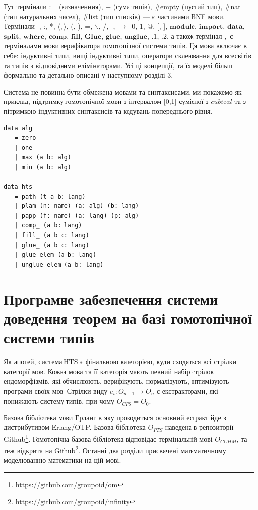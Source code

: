 \begin{definition}
\begin{definition}
\begin{definition}
\begin{definition}
Тут термінали := (визначенния), + (сума типів), \#empty (пустий тип), \#nat (тип натуральних чисел),
\#list (тип списків) --- є частинами BNF мови. Термінали
$\rvert$, :, *, $\langle$, $\rangle$, (, ), =, $\backslash$, /, -, $\rightarrow$, 0, 1, @, [, ],
$\mathbf{module}$, $\mathbf{import}$,
$\mathbf{data}$, $\mathbf{split}$, $\mathbf{where}$, $\mathbf{comp}$, $\mathbf{fill}$,
$\mathbf{Glue}$, $\mathbf{glue}$, $\mathbf{unglue}$,
$\mathbf{.1}$, $\mathbf{.2}$,
а також термінал $,$ є терміналами мови верифікатора гомотопічної системи типів.
Ця мова включає в себе: індуктивні типи, вищі індуктивні типи, оператори склеювання
для всесвітів та типів з відповідними елімінаторами. Усі ці концепції, та їх
моделі більш формально та детально описані у наступному розділі 3.

Система не повинна бути обмежена мовами та синтаксисами, ми покажемо як приклад,
підтримку гомотопічної мови з інтервалом [0,1] сумісної з $cubical$ та з пітримкою індуктивних
синтаксисів та кодувань попереднього рівня.

\begin{lstlisting}[mathescape=true]
data alg
   = zero
   | one
   | max (a b: alg)
   | min (a b: alg)

data hts
   = path (t a b: lang)
   | plam (n: name) (a: alg) (b: lang)
   | papp (f: name) (a: lang) (p: alg)
   | comp_ (a b: lang)
   | fill_ (a b c: lang)
   | glue_ (a b c: lang)
   | glue_elem (a b: lang)
   | unglue_elem (a b: lang)
\end{lstlisting}

\section{Програмне забезпечення системи доведення
         теорем на базі гомотопічної системи типів}

Як апогей, система HTS є фінальною категорією,
куди сходяться всі стрілки категорії мов. Кожна мова та її категорія
мають певний набір стрілок ендоморфізмів, які обчислюють, верифікують,
нормалізують, оптимізують програми своїх мов.
Стрілки виду $e_i: O_{n+1} \rightarrow O_n$ є екстракторами, які понижають систему типів,
при чому $O_{CPS} = O_0$.

Базова бібліотека мови Ерланг в яку проводиться основний
естракт йде з дистрибутивом Erlang/OTP. Базова бібліотека
$O_{PTS}$ наведена в репозиторії Github\footnote{\url{https://github.com/groupoid/om}}.
Гомотопічна базова бібліотека відповідає термінальній мові $O_{CCHM}$, та теж відкрита
на Github\footnote{\url{https://github.com/groupoid/infinity}}.
Останні два розділи присвячені математичному моделюванню математики на цій мові.


\end{definition}
\end{definition}
\end{definition}
\end{definition}
